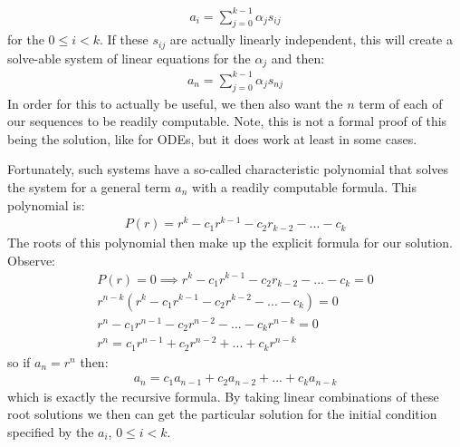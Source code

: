 \documentclass{article}
\begin{document}
\begin{gather*}
	a_{i} = \sum_{j = 0}^{k - 1}\alpha_{j}s_{ij}
\end{gather*}
for the $0 \le i < k$. If these $s_{ij}$ are actually linearly independent, this will create a solve-able system of linear equations for the $\alpha_{j}$ and then:
\begin{gather*}
	a_{n} = \sum_{j = 0}^{k - 1}\alpha_{j}s_{nj}
\end{gather*}
In order for this to actually be useful, we then also want the $n$ term of each of our sequences to be readily computable. Note, this is not a formal proof of this being the solution, like for ODEs, but it does work at least in some cases.

Fortunately, such systems have a so-called characteristic polynomial that solves the system for a general term $a_{n}$ with a readily computable formula. This polynomial is:
\begin{gather*}
	P(r) = r^{k} - c_{1}r^{k - 1} - c_{2}r_{k - 2} - ... - c_{k}
\end{gather*}
The roots of this polynomial then make up the explicit formula for our solution. Observe:
\begin{gather*}
	P(r) = 0 \implies r^{k} - c_{1}r^{k - 1} - c_{2}r_{k - 2} - ... - c_{k} = 0\\
	r^{n-k}\left(r^{k} - c_{1}r^{k - 1} - c_{2}r^{k - 2} - ... - c_{k}\right) = 0\\
	r^{n} - c_{1}r^{n - 1} - c_{2}r^{n - 2} - ... - c_{k}r^{n - k} = 0\\
	r^{n} = c_{1}r^{n - 1} + c_{2}r^{n - 2} + ... + c_{k}r^{n - k}
\end{gather*}
so if $a_{n} = r^{n}$ then:
\begin{gather*}
	a_{n} = c_{1}a_{n - 1} + c_{2}a_{n - 2} + ... + c_{k}a_{n - k}
\end{gather*}
which is exactly the recursive formula. By taking linear combinations of these root solutions we then can get the particular solution for the initial condition specified by the $a_{i}$, $0 \le i < k$. 
\end{document}
